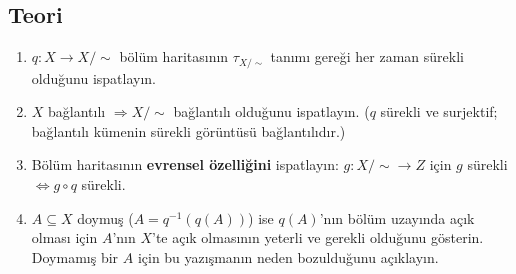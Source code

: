 \subsection*{Teori}

\begin{enumerate}[label=T\arabic*.]
\item $q: X \to X/{\sim}$ bölüm haritasının $\tau_{X/\sim}$ tanımı gereği
      her zaman sürekli olduğunu ispatlayın.
\item $X$ bağlantılı $\Rightarrow X/{\sim}$ bağlantılı olduğunu ispatlayın.
      ($q$ sürekli ve surjektif; bağlantılı kümenin sürekli görüntüsü bağlantılıdır.)
\item Bölüm haritasının \textbf{evrensel özelliğini} ispatlayın:
      $g: X/{\sim} \to Z$ için $g$ sürekli $\iff g \circ q$ sürekli.
\item $A \subseteq X$ doymuş ($A = q^{-1}(q(A))$) ise $q(A)$'nın bölüm uzayında
      açık olması için $A$'nın $X$'te açık olmasının yeterli ve gerekli olduğunu
      gösterin. Doymamış bir $A$ için bu yazışmanın neden bozulduğunu açıklayın.
\end{enumerate}
